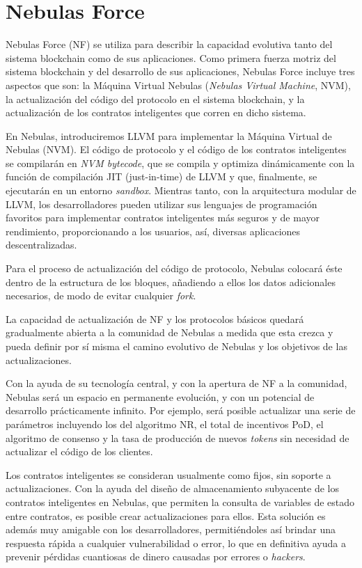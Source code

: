 \section{Nebulas Force}
\label{sec:nebulasforce}

Nebulas Force (NF) se utiliza para describir la capacidad evolutiva tanto del sistema blockchain como de sus aplicaciones. Como primera fuerza motriz del sistema blockchain y del desarrollo de sus aplicaciones, Nebulas Force incluye tres aspectos que son: la Máquina Virtual Nebulas (\textit{Nebulas Virtual Machine}, NVM), la actualización del código del protocolo en el sistema blockchain, y la actualización de los contratos inteligentes que corren en dicho sistema.

En Nebulas, introduciremos LLVM para implementar la Máquina Virtual de Nebulas (NVM). El código de protocolo y el código de los contratos inteligentes se compilarán en \textit{NVM bytecode}, que se compila y optimiza dinámicamente con la función de compilación JIT (just-in-time) de LLVM y que, finalmente, se ejecutarán en un entorno \textit{sandbox}. Mientras tanto, con la arquitectura modular de LLVM, los desarrolladores pueden utilizar sus lenguajes de programación favoritos para implementar contratos inteligentes más seguros y de mayor rendimiento, proporcionando a los usuarios, así, diversas aplicaciones descentralizadas.

Para el proceso de actualización del código de protocolo, Nebulas colocará éste dentro de la estructura de los bloques, añadiendo a ellos los datos adicionales necesarios, de modo de evitar cualquier \textit{fork}.

La capacidad de actualización de NF y los protocolos básicos quedará gradualmente abierta a la comunidad de Nebulas a medida que esta crezca y pueda definir por sí misma el camino evolutivo de Nebulas y los objetivos de las actualizaciones.

Con la ayuda de su tecnología central, y con la apertura de NF a la comunidad, Nebulas será un espacio en permanente evolución, y con un potencial de desarrollo prácticamente infinito. Por ejemplo, será posible actualizar una serie de parámetros incluyendo los del algoritmo NR, el total de incentivos PoD, el algoritmo de consenso y la tasa de producción de nuevos \textit{tokens} sin necesidad de actualizar el código de los clientes.

Los contratos inteligentes se consideran usualmente como fijos, sin soporte a actualizaciones. Con la ayuda del diseño de almacenamiento subyacente de los contratos inteligentes en Nebulas, que permiten la consulta de variables de estado entre contratos, es posible crear actualizaciones para ellos. Esta solución es además muy amigable con los desarrolladores, permitiéndoles así brindar una respuesta rápida a cualquier vulnerabilidad o error, lo que en definitiva ayuda a prevenir pérdidas cuantiosas de dinero causadas por errores o \textit{hackers}.